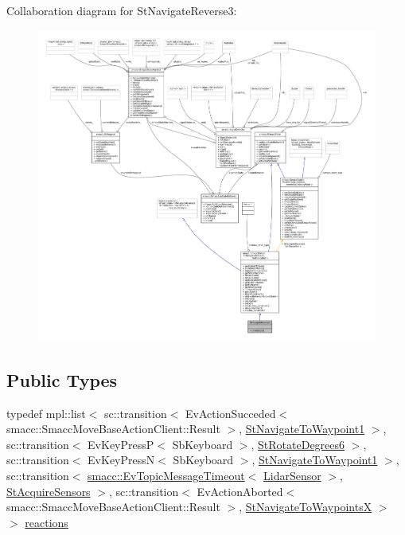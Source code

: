 Collaboration diagram for St\+Navigate\+Reverse3\+:
\nopagebreak
\begin{figure}[H]
\begin{center}
\leavevmode
\includegraphics[width=350pt]{structStNavigateReverse3__coll__graph}
\end{center}
\end{figure}
\subsection*{Public Types}
\begin{DoxyCompactItemize}
\item 
typedef mpl\+::list$<$ sc\+::transition$<$ Ev\+Action\+Succeded$<$ smacc\+::\+Smacc\+Move\+Base\+Action\+Client\+::\+Result $>$, \hyperlink{structStNavigateToWaypoint1}{St\+Navigate\+To\+Waypoint1} $>$, sc\+::transition$<$ Ev\+Key\+PressP$<$ Sb\+Keyboard $>$, \hyperlink{structStRotateDegrees6}{St\+Rotate\+Degrees6} $>$, sc\+::transition$<$ Ev\+Key\+PressN$<$ Sb\+Keyboard $>$, \hyperlink{structStNavigateToWaypoint1}{St\+Navigate\+To\+Waypoint1} $>$, sc\+::transition$<$ \hyperlink{structsmacc_1_1EvTopicMessageTimeout}{smacc\+::\+Ev\+Topic\+Message\+Timeout}$<$ \hyperlink{sensor__state_8h_a9db9e1944f88de79507758d08e4a2ee3}{Lidar\+Sensor} $>$, \hyperlink{structStAcquireSensors}{St\+Acquire\+Sensors} $>$, sc\+::transition$<$ Ev\+Action\+Aborted$<$ smacc\+::\+Smacc\+Move\+Base\+Action\+Client\+::\+Result $>$, \hyperlink{structStNavigateToWaypointsX}{St\+Navigate\+To\+WaypointsX} $>$ $>$ \hyperlink{structStNavigateReverse3_a8ad63828ba9ef72abfce33203118acfd}{reactions}
\end{DoxyCompactItemize}
